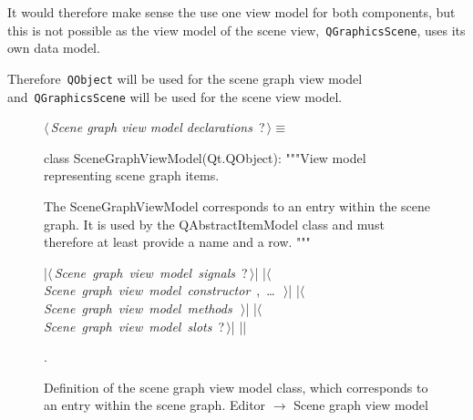 \documentclass[%
    a4paper,    %
    justified,  %
    nobib,      %
    openany     %
]{tufte-book}
\begin{document}
It would therefore make sense the use one view model for both components, but
this is not possible as the view model of the scene view,~\verb=QGraphicsScene=,
uses its own data model.

Therefore~\verb=QObject= will be used for the scene graph view model
and~\verb=QGraphicsScene= will be used for the scene view model.

\begin{figure}
\begin{flushleft} \small
\begin{minipage}{\linewidth}\label{scrap23}\raggedright\small
{} $\langle\,${\itshape Scene graph view model declarations}\nobreak\ {\footnotesize {?}}$\,\rangle\equiv$
\vspace{-1ex}
\begin{pythoncode}
class SceneGraphViewModel(Qt.QObject):
    """View model representing scene graph items.

    The SceneGraphViewModel corresponds to an entry within the
    scene graph. It is used by the QAbstractItemModel class and
    must therefore at least provide a name and a row.
    """

    |\hbox{$\langle\,${\itshape Scene graph view model signals}\nobreak\ {\footnotesize ?}$\,\rangle$}|
    |\hbox{$\langle\,${\itshape Scene graph view model constructor}\nobreak\ {\footnotesize {}, \ldots\ }$\,\rangle$}|
    |\hbox{$\langle\,${\itshape Scene graph view model methods}\nobreak\ {\footnotesize {}}$\,\rangle$}|
    |\hbox{$\langle\,${\itshape Scene graph view model slots}\nobreak\ {\footnotesize ?}$\,\rangle$}|
|\NWsep|
\end{pythoncode}
\vspace{1.5ex}
\footnotesize
\begin{list}{}{\setlength{\itemsep}{-\parsep}\setlength{\itemindent}{-\leftmargin}}
\item {\NWtxtMacroNoRef}.

\item{}
\end{list}
\end{minipage}\vspace{4ex}
\end{flushleft}
\caption{Definition of the scene graph view model class, which corresponds to an
  entry within the scene graph.
  \newline{}\newline{}Editor $\rightarrow$ Scene graph view model}
\label{editor:lst:scene-graph-view-model}
\end{figure}
\end{document}

